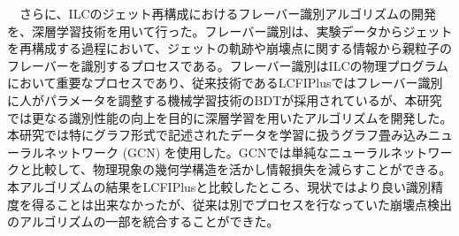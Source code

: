　さらに、ILCのジェット再構成におけるフレーバー識別アルゴリズムの開発を、深層学習技術を用いて行った。フレーバー識別は、実験データからジェットを再構成する過程において、ジェットの軌跡や崩壊点に関する情報から親粒子のフレーバーを識別するプロセスである。フレーバー識別はILCの物理プログラムにおいて重要なプロセスであり、従来技術であるLCFIPlusではフレーバー識別に人がパラメータを調整する機械学習技術のBDTが採用されているが、本研究では更なる識別性能の向上を目的に深層学習を用いたアルゴリズムを開発した。本研究では特にグラフ形式で記述されたデータを学習に扱うグラフ畳み込みニューラルネットワーク (GCN) を使用した。GCNでは単純なニューラルネットワークと比較して、物理現象の幾何学構造を活かし情報損失を減らすことができる。本アルゴリズムの結果をLCFIPlusと比較したところ、現状ではより良い識別精度を得ることは出来なかったが、従来は別でプロセスを行なっていた崩壊点検出のアルゴリズムの一部を統合することができた。